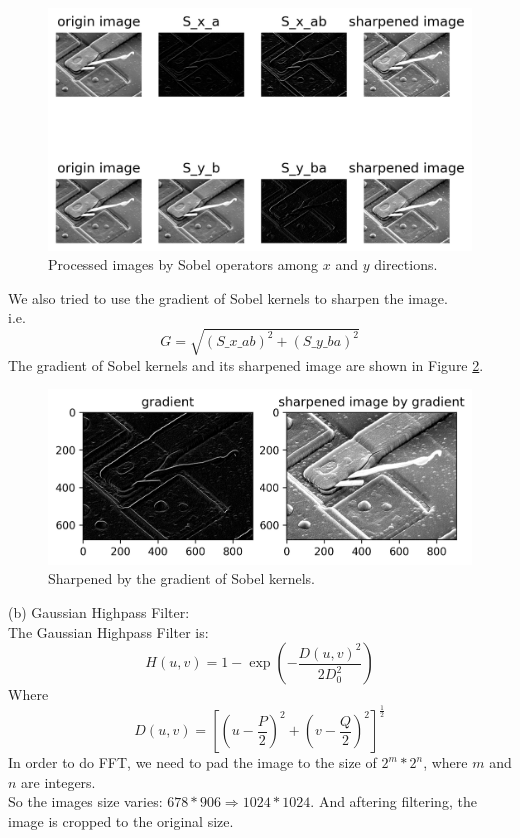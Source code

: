 \begin{figure}[htbp]
    \centering
	\includegraphics[width=\textwidth]{../images/p1/p1a.png}
    \caption{Processed images by Sobel operators among $x$ and $y$ directions.}
    \label{fig:p1a}
\end{figure}
We also tried to use the gradient of Sobel kernels to sharpen the image.\\
i.e.
$$G = \sqrt{(S\_x\_ab)^2 + (S\_y\_ba)^2}$$
The gradient of Sobel kernels and its sharpened image are shown in Figure \ref{fig:p1a_gradient}.\\
\begin{figure}[htbp]
    \centering
	\includegraphics[width=\textwidth]{../images/p1/p1a_gradient.png}
    \caption{Sharpened by the gradient of Sobel kernels.}
    \label{fig:p1a_gradient}
\end{figure}


(b) Gaussian Highpass Filter:\\
The Gaussian Highpass Filter is:
$$H(u,v)=1-\exp\left(-\dfrac{D(u,v)^2}{2D_0^2}\right)$$
Where
$$D(u,v)=\left[\left(u-\dfrac{P}{2}\right)^2+\left(v-\dfrac{Q}{2}\right)^2\right]^\frac{1}{2}$$
In order to do FFT, we need to pad the image to the size of $2^m*2^n$, where $m$ and $n$ are integers.\\
So the images size varies: $678*906\Rightarrow 1024*1024$.
And aftering filtering, the image is cropped to the original size.


